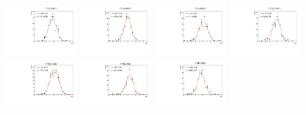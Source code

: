 \begin{figure}[h]\centering
    \includegraphics[width=0.24\textwidth]{figure/io/fitfrac/pull_fitfrac_res0_comb.pdf}
    \includegraphics[width=0.24\textwidth]{figure/io/fitfrac/pull_fitfrac_res1_comb.pdf}
    \includegraphics[width=0.24\textwidth]{figure/io/fitfrac/pull_fitfrac_res2_comb.pdf}
    \includegraphics[width=0.24\textwidth]{figure/io/fitfrac/pull_fitfrac_res3_comb.pdf}
    \includegraphics[width=0.24\textwidth]{figure/io/fitfrac/pull_fitfrac_res4_comb.pdf}
    \includegraphics[width=0.24\textwidth]{figure/io/fitfrac/pull_fitfrac_res5_comb.pdf}
    \includegraphics[width=0.24\textwidth]{figure/io/fitfrac/pull_fitfrac_res6_comb.pdf}

\end{figure}
